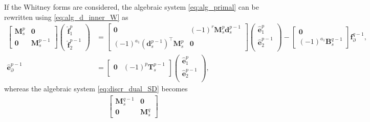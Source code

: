\documentclass{elsarticle}
\newcommand*{\dual}[1]{\ensuremath{\widehat{#1}}}
\begin{document}
{If the Whitney forms are considered, the algebraic system \eqref{eq:alg_primal} can be rewritten using \eqref{eq:alg_d_inner_W} as
\begin{equation}\label{eq:alg_primal_W}
\begin{aligned}
    \begin{bmatrix}
        \mathbf{M}^p_s & \mathbf{0} \\
        \mathbf{0} & \mathbf{M}^{p-1}_s
    \end{bmatrix}
    \begin{pmatrix}
    \dual{\mathbf{f}}^p_1 \\
    \dual{\mathbf{f}}^{p-1}_2
    \end{pmatrix} &=
    \begin{bmatrix}
        \mathbf{0} & (-1)^r\mathbf{M}^p_s\mathbf{d}^{p-1}_s \\
        (-1)^{a_1}(\mathbf{d}^{p-1}_s)^\top \mathbf{M}^p_s & \mathbf{0}
    \end{bmatrix}
    \begin{pmatrix}
    \dual{\mathbf{e}}^p_1 \\
    \dual{\mathbf{e}}^{p-1}_2 \\
    \end{pmatrix} - \begin{bmatrix}
        \mathbf{0} \\
        (-1)^{a_1} \mathbf{B}^{q-1}_{s}
    \end{bmatrix} \mathbf{f}^{q-1}_\partial, \\
    \dual{\mathbf{e}}^{p-1}_\partial 
    &= 
    \begin{bmatrix}
    \mathbf{0} & (-1)^p\mathbf{T}^{p-1}_s \\
    \end{bmatrix}
    \begin{pmatrix}
    \dual{\mathbf{e}}^p_1 \\
    \dual{\mathbf{e}}^{p-1}_2 \\
    \end{pmatrix},
\end{aligned}
\end{equation}
whereas the algebraic system \eqref{eq:discr_dual_SD} becomes
\begin{equation}\label{eq:alg_dual_W}
\begin{aligned}
    \begin{bmatrix}
        \mathbf{M}^{q-1}_s & \mathbf{0} \\
        \mathbf{0} & \mathbf{M}^q_s
    \end{bmatrix}

\end{aligned}
\end{equation}}
\end{document}
